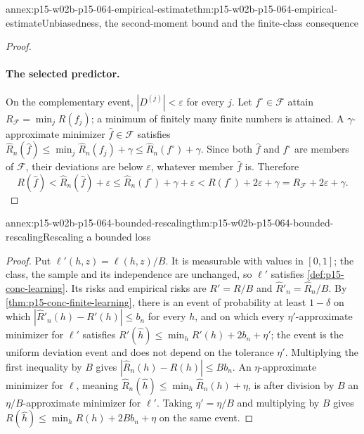 \begin{annexitem}{annex:p15-w02b-p15-064-empirical-estimate}{thm:p15-w02b-p15-064-empirical-estimate}{Unbiasedness, the second-moment bound and the finite-class consequence}
\begin{proof}
\paragraph{The selected predictor.}
On the complementary event, \(|D^{(j)}|<\varepsilon\) for every \(j\). Let
\(f^{\circ}\in\mathcal F\) attain \(R_{\mathcal F}=\min_jR(f_j)\); a minimum
of finitely many finite numbers is attained. A \(\gamma\)-approximate
minimizer \(\widehat f\in\mathcal F\) satisfies
\(\widehat R_n(\widehat f)\leq\min_j\widehat R_n(f_j)+\gamma
\leq\widehat R_n(f^{\circ})+\gamma\). Since both \(\widehat f\) and
\(f^{\circ}\) are members of \(\mathcal F\), their deviations are below
\(\varepsilon\), whatever member \(\widehat f\) is. Therefore
\[
 R(\widehat f)<\widehat R_n(\widehat f)+\varepsilon
 \leq\widehat R_n(f^{\circ})+\gamma+\varepsilon
 <R(f^{\circ})+2\varepsilon+\gamma
 =R_{\mathcal F}+2\varepsilon+\gamma.
\]
\end{proof}
\end{annexitem}

\begin{annexitem}{annex:p15-w02b-p15-064-bounded-rescaling}{thm:p15-w02b-p15-064-bounded-rescaling}{Rescaling a bounded loss}
\begin{proof}
Put \(\ell'(h,z)=\ell(h,z)/B\). It is measurable with values in \([0,1]\);
the class, the sample and its independence are unchanged, so \(\ell'\)
satisfies \cref{def:p15-conc-learning}. Its risks and empirical risks are
\(R'=R/B\) and \(\widehat R'_n=\widehat R_n/B\). By
\cref{thm:p15-conc-finite-learning}, there is an event of probability at
least \(1-\delta\) on which \(|\widehat R'_n(h)-R'(h)|\leq b_n\) for every
\(h\), and on which every \(\eta'\)-approximate minimizer for \(\ell'\)
satisfies \(R'(\widehat h)\leq\min_hR'(h)+2b_n+\eta'\); the event is the
uniform deviation event and does not depend on the tolerance \(\eta'\).
Multiplying the first inequality by \(B\) gives
\(|\widehat R_n(h)-R(h)|\leq Bb_n\). An \(\eta\)-approximate minimizer for
\(\ell\), meaning \(\widehat R_n(\widehat h)\leq\min_h\widehat R_n(h)+\eta\),
is after division by \(B\) an \(\eta/B\)-approximate minimizer for \(\ell'\).
Taking \(\eta'=\eta/B\) and multiplying by \(B\) gives
\(R(\widehat h)\leq\min_hR(h)+2Bb_n+\eta\) on the same event.
\end{proof}
\end{annexitem}

